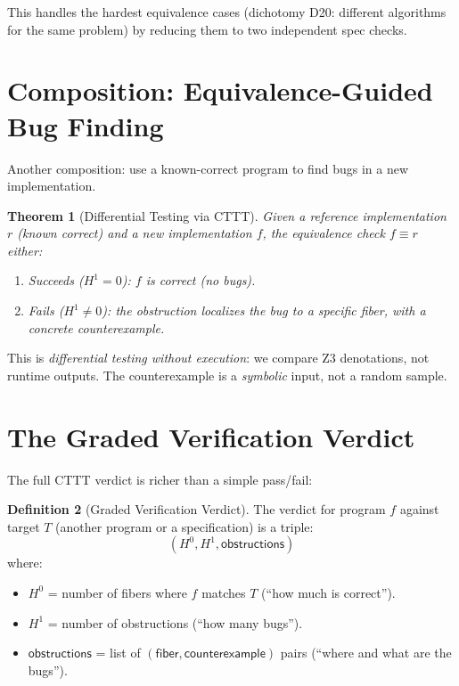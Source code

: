 \documentclass[11pt,a4paper]{report}
\theoremstyle{definition}
\newtheorem{definition}{Definition}[chapter]
\theoremstyle{plain}
\newtheorem{theorem}[definition]{Theorem}
\newcommand{\Hzero}{H^0}
\newcommand{\Hone}{H^1}
\begin{document}
This handles the hardest equivalence cases (dichotomy D20: different
algorithms for the same problem) by reducing them to two independent
spec checks.

\section{Composition: Equivalence-Guided Bug Finding}

Another composition: use a known-correct program to find bugs in
a new implementation.

\begin{theorem}[Differential Testing via CTTT]
Given a reference implementation $r$ (known correct) and a new
implementation $f$, the equivalence check $f \equiv r$ either:
\begin{enumerate}
  \item Succeeds ($\Hone = 0$): $f$ is correct (no bugs).
  \item Fails ($\Hone \neq 0$): the obstruction localizes the bug
    to a specific fiber, with a concrete counterexample.
\end{enumerate}
\end{theorem}

This is \emph{differential testing without execution}: we compare
Z3 denotations, not runtime outputs.  The counterexample is a
\emph{symbolic} input, not a random sample.

\section{The Graded Verification Verdict}

The full CTTT verdict is richer than a simple pass/fail:

\begin{definition}[Graded Verification Verdict]
The verdict for program $f$ against target $T$ (another program or
a specification) is a triple:
\[
  (\Hzero, \Hone, \mathsf{obstructions})
\]
where:
\begin{itemize}
  \item $\Hzero$ = number of fibers where $f$ matches $T$
    (``how much is correct'').
  \item $\Hone$ = number of obstructions (``how many bugs'').
  \item $\mathsf{obstructions}$ = list of
    $(\mathsf{fiber}, \mathsf{counterexample})$ pairs
    (``where and what are the bugs'').
\end{itemize}
\end{definition}
\end{document}
